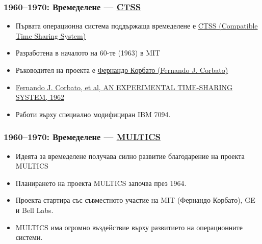 \documentclass[ignorenonframetext, hyperref=unicode]{beamer}
\begin{document}
\begin{frame}
\frametitle{1960--1970: Времеделене --- \href{http://en.wikipedia.org/wiki/CTSS}{CTSS}}
\begin{itemize}
  \item Първата операционна система поддържаща времеделене е
  \href{http://en.wikipedia.org/wiki/Open_Source_history}{CTSS (Compatible 
  Time Sharing System)}
  \item Разработена в началото на 60-те (1963) в MIT
  \item Ръководител на проекта е
  \href{http://en.wikipedia.org/wiki/Fernando_J._Corbato}{Фернандо Корбато
  (Fernando J. Corbato)}  
  \item  \href{http://larch-www.lcs.mit.edu:8001/~corbato/sjcc62/}{Fernando J.
  Corbato, et al, AN EXPERIMENTAL TIME-SHARING SYSTEM, 1962} 
  \item Работи върху специално модифициран IBM 7094.
\end{itemize}
\end{frame}

\begin{frame}
\frametitle{1960--1970: Времеделене --- \href{http://en.wikipedia.org/wiki/Multics}{MULTICS}}
\begin{itemize}
  \item Идеята за времеделене получава силно развитие благодарение на проекта MULTICS
  \item Планирането на проекта MULTICS започва през 1964.
  \item Проекта стартира със съвместното участие на MIT (Фернандо Корбато), GE
  и Bell Labs. 
  \item MULTICS има огромно въздействие върху развитието на операционните системи.
\end{itemize}
\end{frame}
\end{document}
